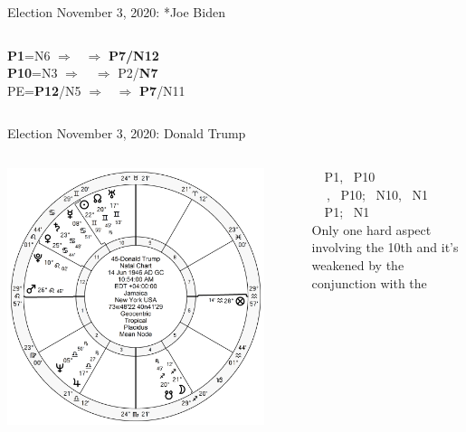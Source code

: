 \begin{frame}[t]{Election November 3, 2020: *Joe Biden}
\begin{columns}[T, onlytextwidth]
\textbf{\dgreen P1}=N6
	$\Rightarrow$ \Venus\, $\Rightarrow$ \textbf{\dgreen P7/N12}\\
\textbf{\red P10}=N3
	$\Rightarrow$ \Saturn\,\Retrograde\, $\Rightarrow$ P2/\textbf{\dgreen N7}\\
PE=\textbf{\dgreen P12}/N5
	 $\Rightarrow$ \Mars\, $\Rightarrow$ \textbf{\dgreen P7}/N11

\end{columns}
\end{frame}

\begin{frame}[t]{Election November 3, 2020: Donald Trump}
\small
\begin{columns}[T, onlytextwidth]
\vspace{-1em}
{\includegraphics[width=0.9\textwidth]{charts/Trump.png}}
\fontsize{8pt}{9pt}\selectfont

\Venus\, \Trine\, P1, \Sextile\, P10 \\
\Moon\, \Conjunction\, \SouthNode\,, \Trine\, P10; \Opposition\, N10, \Square\, N1 \\
\Saturn\, \Trine\, P1; \Sextile\, N1 \\
\vspace{0.5em}
Only one hard aspect involving the 10th and it's weakened by the conjunction with the \SouthNode\,


\end{columns}
\end{frame}
